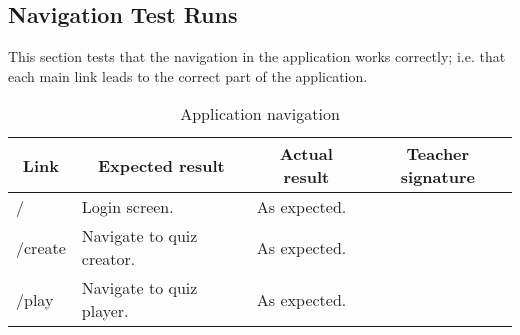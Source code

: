 \subsection{Navigation Test Runs}
This section tests that the navigation in the application works correctly; i.e. that each main link leads to the correct part of the application.

\begin{table}[]
\centering
\begin{tabular}{|l|l|l|l|}
\hline
\multicolumn{1}{|c|}{\textbf{Link}} & \multicolumn{1}{c|}{\textbf{Expected result}} & \multicolumn{1}{c|}{\textbf{Actual result}} & \multicolumn{1}{c|}{\textbf{Teacher signature}} \\ \hline
/                                   & Login screen.                                 & As expected.                                &                                                 \\ \hline
/create                             & Navigate to quiz creator.                     & As expected.                                &                                                 \\ \hline
/play                               & Navigate to quiz player.                      & As expected.                                &                                                 \\ \hline
\end{tabular}
\caption{Application navigation}
\label{application-navigation}
\end{table}
